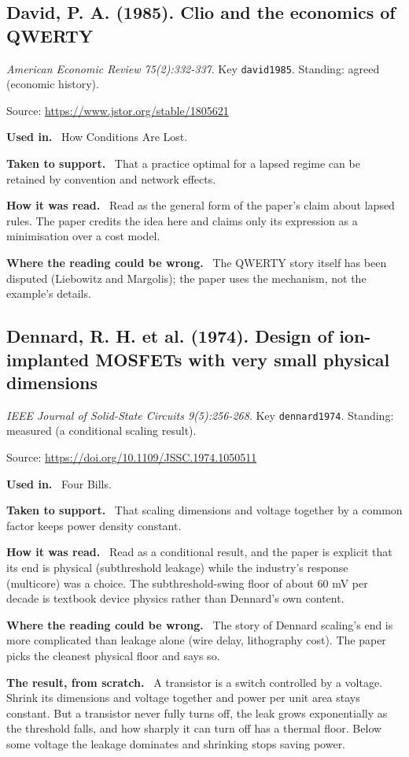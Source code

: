 \documentclass[11pt,oneside]{article}
\newcommand{\field}[1]{\par\noindent\textbf{\color{accent}#1.}\ }
\begin{document}
\subsection*{David, P. A. (1985). Clio and the economics of QWERTY}
\noindent\small\emph{American Economic Review 75(2):332-337}. Key \texttt{david1985}. Standing: agreed (economic history).
\par\noindent\small Source: \url{https://www.jstor.org/stable/1805621}
\normalsize
\field{Used in} How Conditions Are Lost.
\field{Taken to support} That a practice optimal for a lapsed regime can be retained by convention and network effects.
\field{How it was read} Read as the general form of the paper's claim about lapsed rules. The paper credits the idea here and claims only its expression as a minimisation over a cost model.
\field{Where the reading could be wrong} The QWERTY story itself has been disputed (Liebowitz and Margolis); the paper uses the mechanism, not the example's details.

\hypertarget{src:dennard1974}{}
\subsection*{Dennard, R. H. et al. (1974). Design of ion-implanted MOSFETs with very small physical dimensions}
\noindent\small\emph{IEEE Journal of Solid-State Circuits 9(5):256-268}. Key \texttt{dennard1974}. Standing: measured (a conditional scaling result).
\par\noindent\small Source: \url{https://doi.org/10.1109/JSSC.1974.1050511}
\normalsize
\field{Used in} Four Bills.
\field{Taken to support} That scaling dimensions and voltage together by a common factor keeps power density constant.
\field{How it was read} Read as a conditional result, and the paper is explicit that its end is physical (subthreshold leakage) while the industry's response (multicore) was a choice. The subthreshold-swing floor of about 60 mV per decade is textbook device physics rather than Dennard's own content.
\field{Where the reading could be wrong} The story of Dennard scaling's end is more complicated than leakage alone (wire delay, lithography cost). The paper picks the cleanest physical floor and says so.
\field{The result, from scratch} A transistor is a switch controlled by a voltage. Shrink its dimensions and voltage together and power per unit area stays constant. But a transistor never fully turns off, the leak grows exponentially as the threshold falls, and how sharply it can turn off has a thermal floor. Below some voltage the leakage dominates and shrinking stops saving power.
\end{document}
